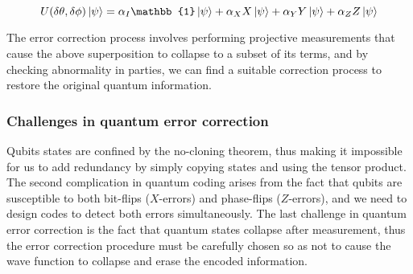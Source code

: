 \[
    U(\delta \theta, \delta \phi) \ket{\psi} = \alpha_{I} \mathbb{1} \ket{\psi} + \alpha_{X} X \ket{\psi} + \alpha_{Y} Y \ket{\psi} + \alpha_{Z} Z \ket{\psi}
\]

The error correction process involves performing projective measurements that cause the above superposition to collapse to a subset of its terms, and by checking abnormality in parties, we can find a suitable correction process to restore the original quantum information.

\subsubsection{Challenges in quantum error correction}

Qubits states are confined by the no-cloning theorem, thus making it impossible for us to add redundancy by simply copying states and using the tensor product. The second complication in quantum coding arises from the fact that qubits are susceptible to both bit-flips ($X$-errors) and phase-flips ($Z$-errors),  and we need to design codes to detect both errors simultaneously. The last challenge in quantum error correction is the fact that quantum states collapse after measurement, thus the error correction procedure must be carefully chosen so as not to cause the wave function to collapse and erase the encoded information.
